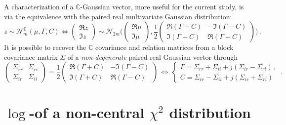 \documentclass[a4paper,10pt]{article}
\newcommand{\cplx}{\mathbb{C}}
\begin{document}
A characterization of a $\cplx$-Gaussian vector, more useful for the current study, is via the
equivalence with the paired real multivariate Gaussian distribution:
$$
z \sim \mathcal{N}^\cplx_m(\mu, \Gamma, C)
  \Leftrightarrow
  \begin{pmatrix}
    \Re z \\ \Im z
  \end{pmatrix}
    \sim \mathcal{N}_{2 m}\biggl(
      \begin{pmatrix}
        \Re \mu \\ \Im \mu
      \end{pmatrix},
      \frac12
      \begin{pmatrix}
        \Re{(\Gamma + C)} & - \Im{(\Gamma - C)} \\
        \Im{(\Gamma + C)} &   \Re{(\Gamma - C)}
      \end{pmatrix}
    \biggr)
  \,. $$
It is possible to recover the $\cplx$ covariance and relation matrices from a block covariance
matrix $\Sigma$ of a \textit{non-degenerate} paired real Gaussian vector through
$$
\begin{pmatrix}
  \Sigma_{rr} & \Sigma_{ri} \\ 
  \Sigma_{ir} & \Sigma_{ii} 
\end{pmatrix}
  = \frac12
    \begin{pmatrix}
      \Re{(\Gamma + C)} & - \Im{(\Gamma - C)} \\
      \Im{(\Gamma + C)} &   \Re{(\Gamma - C)}
    \end{pmatrix}
  \, \Leftrightarrow
  \,
  \begin{cases}
    \Gamma
      = \Sigma_{rr} + \Sigma_{ii} + j (\Sigma_{ir} - \Sigma_{ri})
    \,, \\
    C = \Sigma_{rr} - \Sigma_{ii} + j (\Sigma_{ir} + \Sigma_{ri}) 
  \end{cases}
  \,. $$


\section{$\log$-of a non-central $\chi^2$ distribution} %
\label{sec:log_of_a_non_central_chi_sq_distribution}

\cite{lapidoth_capacity_2003}



\clearpage



\nocite{*}
\end{document}
